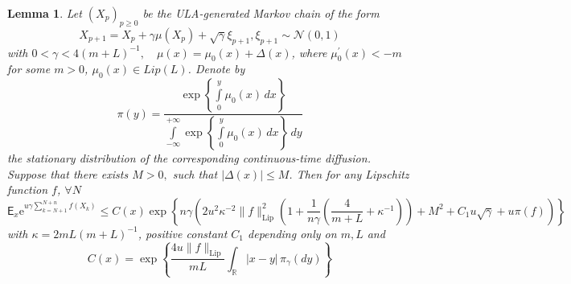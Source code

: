 \documentclass[bj]{imsart}
\def\PE{\mathsf{E}}
\def\rset{\mathbb{R}}
\def\rme{\mathrm{e}}
\def\rset{\mathbb{R}}
\newtheorem{lem}[thm]{Lemma}
\begin{document}
\begin{lem} 
\label{lem:exp_bound}
Let $(X_p)_{p \geq 0}$ be the ULA-generated Markov chain of the form
\[
X_{p+1} = X_p + \gamma \mu(X_p) + \sqrt{\gamma}\xi_{p+1}, \xi_{p+1} \sim \mathcal{N}(0,1)
\]
 with $0 < \gamma < 4(m+L)^{-1}, \quad \mu(x) = \mu_{0}(x) + \Delta(x)$, where $\mu_0^{\prime}(x) <-m$ for some $m > 0$, $\mu_0(x) \in Lip(L)$. Denote by 
 \[
 \pi(y) = \frac{\exp\left\{\int\limits_{0}^{y}\mu_{0}(x)\,dx\right\}}{\int\limits_{-\infty}^{+\infty}\exp\left\{\int\limits_{0}^{y}\mu_{0}(x)\,dx\right\}\,dy}
 \]
 the stationary distribution of the corresponding continuous-time diffusion.
 Suppose that there exists $M > 0,$ such that $\left|\Delta(x)\right| \leq M$.
 Then for any Lipschitz function $f$, $\forall N $
\begin{equation}
\label{eq:exp_bound}
\PE_x \rme^{u\gamma\sum\limits_{k=N+1}^{N+n}f(X_k)} \leq C(x)\exp\left\{n\gamma\left(2u^2\kappa^{-2} \|f\|^2_{\text{Lip}}\left(1+\frac{1}{n\gamma}\left(\frac{4}{m+L} + \kappa^{-1}\right)\right) + M^2 + C_1u\sqrt{\gamma} +  u\pi(f)\right)\right\}
\end{equation}
with $\kappa = 2mL(m+L)^{-1}$, positive constant $C_1$ depending only on $m,L$ and 
\[
C(x) = \exp\left\{\frac{4u\|f\|_{\text{Lip}}}{mL}\int_{\rset}|x-y|\,\pi_{\gamma}(dy)\right\}
\]
\end{lem}
\end{document}
